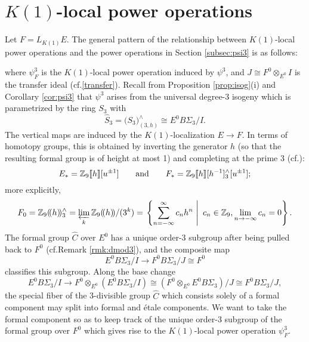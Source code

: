 \documentclass{gtpart}
\theoremstyle{definition}
\theoremstyle{remark}
\newcommand{\mb}[1]{\mathbb{#1}}
\newcommand{\cf}{cf.\thinspace}
\newcommand{\BZ}{{\mb Z}}
\newcommand{\HC}{\widehat{C}}
\newcommand{\HS}{\widehat{S}}
\newcommand{\ad}{{\rm and}}
\newcommand{\p}{\psi^3}
\begin{document}
\section{$K(1)$-local power operations}
\label{sec:K(1)}

Let $F = L_{K(1)} E$.  The general pattern of the relationship between $K(1)$-local power operations and the power operations in Section \ref{subsec:psi3} is as follows: 
\begin{center}
\end{center}
where $\psi_F^3$ is the $K(1)$-local power operation induced by $\p$, and $J \cong F^0 \otimes_{E^0} I$ is the transfer ideal (\cf \eqref{transfer}).  
Recall from Proposition \ref{prop:isog}\thinspace (i) and Corollary \ref{cor:psi3} that $\p$ arises from the universal degree-3 isogeny 
which is parametrized by the ring $S_3$ with 
\[
 \HS_3 = \big( S_3 \big)_{(3,h)}^\wedge \cong E^0 B\Sigma_3 / I.  
\]
The vertical maps are induced by the $K(1)$-localization $E \to F$.  In terms of 
homotopy groups, this is obtained by inverting the generator $h$ (so that 
the resulting formal group is of height at most 1) and completing at the prime 3 (\cf \cite[Corollary 1.5.5]{hovey}): 
\[
 E_* = \BZ_9 \llbracket h \rrbracket [u^{\pm1}] \qquad \ad \qquad F_* = \BZ_9 \llbracket h \rrbracket [h^{-1}]_3^\wedge [u^{\pm1}]; 
\]
more explicitly, 
\begin{equation}
\label{K(1)homotopy}
 F_0 = \BZ_9 (\!(h)\!)_3^\wedge = \varprojlim_k \BZ_9 (\!(h)\!) /(3^k) = 
 \left.\left\{\sum_{n = -\infty}^{\infty} c_n h^n~\right|~c_n \in \BZ_9, 
 \lim_{n \to -\infty} c_n = 0\right\}.  
\end{equation}
The formal group $\HC$ over $E^0$ has a unique order-3 subgroup after being pulled back to $F^0$ (\cf Remark \ref{rmk:dmod3}), 
and the composite map 
\[
 E^0 B\Sigma_3 / I \to F^0 B\Sigma_3 / J \cong F^0 
\]
classifies this subgroup.  Along the base change 
\[
 E^0 B\Sigma_3 / I \to F^0 \otimes_{E^0} (E^0 B\Sigma_3 / I) \cong (F^0 \otimes_{E^0} E^0 B\Sigma_3) / J \cong F^0 B\Sigma_3 / J, 
\]
the special fiber of the 3-divisible group $\HC$ which consists solely of a formal component may split into formal and \'etale components.  
We want to take the formal component so as to keep track of the unique order-3 subgroup of the formal group over $F^0$ 
which gives rise to the $K(1)$-local power operation $\psi_F^3$.  
\end{document}
